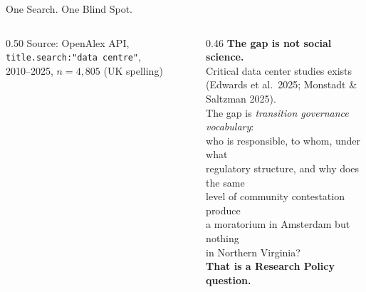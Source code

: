 \documentclass[aspectratio=169,11pt]{beamer}
\newcommand{\iconfull}[2]{\textcolor{#1}{\faIcon{#2}}}
\newcommand{\highlight}[1]{\textcolor{dchighlight}{\textbf{#1}}}
\begin{document}
\begin{frame}{\iconfull{dcblue}{search}\enspace One Search. One Blind Spot.}
\begin{columns}[T]
\begin{column}{0.50\textwidth}
  \vspace{0.4em}
  \scriptsize\textcolor{dcgray}{Source: OpenAlex API, \texttt{title.search:"data centre"},\\
  2010--2025, $n = 4{,}805$ (UK spelling)}
\end{column}
\begin{column}{0.46\textwidth}
  \vspace{0.6em}
  \small\textbf{The gap is not social science.}\\[0.3em]
  \footnotesize
  Critical data center studies exists\\
  (Edwards et al.\ 2025; Monstadt \& Saltzman 2025).\\[0.4em]
  The gap is \textit{transition governance vocabulary}:\\
  who is responsible, to whom, under what\\
  regulatory structure, and why does the same\\
  level of community contestation produce\\
  a moratorium in Amsterdam but nothing\\
  in Northern Virginia?\\[0.4em]
  \highlight{That is a Research Policy question.}
\end{column}
\end{columns}
\end{frame}
\end{document}
